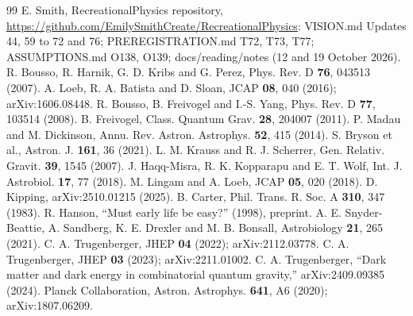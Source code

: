 \documentclass[pre,twocolumn,superscriptaddress,nofootinbib]{revtex4-2}
\begin{document}
\begin{thebibliography}{99}
 E. Smith, RecreationalPhysics repository, \url{https://github.com/EmilySmithCreate/RecreationalPhysics}: VISION.md Updates 44, 59 to 72 and 76; PREREGISTRATION.md T72, T73, T77; ASSUMPTIONS.md O138, O139; docs/reading/notes (12 and 19 October 2026).
 R. Bousso, R. Harnik, G. D. Kribs and G. Perez, Phys. Rev. D \textbf{76}, 043513 (2007).
 A. Loeb, R. A. Batista and D. Sloan, JCAP \textbf{08}, 040 (2016); arXiv:1606.08448.
 R. Bousso, B. Freivogel and I.-S. Yang, Phys. Rev. D \textbf{77}, 103514 (2008).
 B. Freivogel, Class. Quantum Grav. \textbf{28}, 204007 (2011).
 P. Madau and M. Dickinson, Annu. Rev. Astron. Astrophys. \textbf{52}, 415 (2014).
 S. Bryson et al., Astron. J. \textbf{161}, 36 (2021).
 L. M. Krauss and R. J. Scherrer, Gen. Relativ. Gravit. \textbf{39}, 1545 (2007).
 J. Haqq-Misra, R. K. Kopparapu and E. T. Wolf, Int. J. Astrobiol. \textbf{17}, 77 (2018).
 M. Lingam and A. Loeb, JCAP \textbf{05}, 020 (2018).
 D. Kipping, arXiv:2510.01215 (2025).
 B. Carter, Phil. Trans. R. Soc. A \textbf{310}, 347 (1983).
 R. Hanson, ``Must early life be easy?'' (1998), preprint.
 A. E. Snyder-Beattie, A. Sandberg, K. E. Drexler and M. B. Bonsall, Astrobiology \textbf{21}, 265 (2021).
 C. A. Trugenberger, JHEP \textbf{04} (2022); arXiv:2112.03778.
 C. A. Trugenberger, JHEP \textbf{03} (2023); arXiv:2211.01002.
 C. A. Trugenberger, ``Dark matter and dark energy in combinatorial quantum gravity,'' arXiv:2409.09385 (2024).
 Planck Collaboration, Astron. Astrophys. \textbf{641}, A6 (2020); arXiv:1807.06209.
\end{thebibliography}
\end{document}
